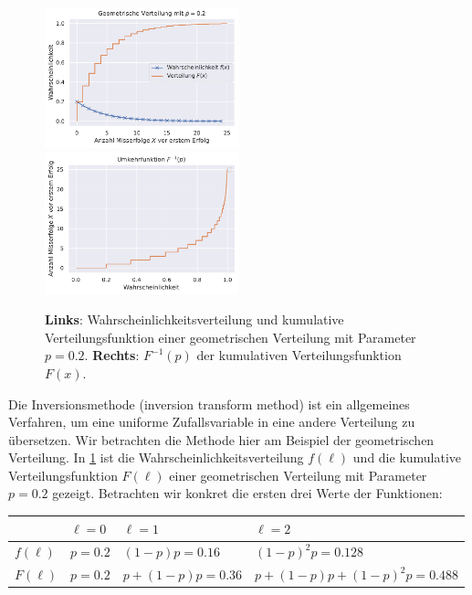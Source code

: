 \begin{figure}[t]
    \begin{center}
        \includegraphics[width=0.5\textwidth]{data/geometric-distr.pdf}%
        \includegraphics[width=0.5\textwidth]{data/geometric-distr-inv.pdf}
    \end{center}

    \caption{
        \textbf{Links}: Wahrscheinlichkeitsverteilung und kumulative Verteilungsfunktion einer geometrischen Verteilung mit Parameter $p = 0.2$.
        \textbf{Rechts}:  $F^{-1}(p)$ der kumulativen Verteilungsfunktion $F(x)$.
    }
    \label{fig:geometric-distr}
\end{figure}

Die  Inversionsmethode (inversion transform method) ist ein allgemeines Verfahren, um eine uniforme Zufallsvariable in eine andere Verteilung zu übersetzen.
Wir betrachten die Methode hier am Beispiel der geometrischen Verteilung.
In \cref{fig:geometric-distr} ist die Wahrscheinlichkeitsverteilung $f(\ell)$ und die kumulative Verteilungsfunktion $F(\ell)$ einer geometrischen Verteilung mit Parameter $p = 0.2$ gezeigt.
%
Betrachten wir konkret die ersten drei Werte der Funktionen:

\begin{center}
    \begin{tabular}{l|p{}p{}p{}}
                  & $\ell = 0$ & $\ell = 1$              & $\ell = 2$                              \\\hline\hline
        $f(\ell)$ & $p =0.2$   & $(1 {-} p)p = 0.16$     & $(1 {-} p)^2p = 0.128$                  \\
        $F(\ell)$ & $p =0.2$   & $p{+}(1 {-} p)p = 0.36$ & $p{+}(1 {-} p)p{+}(1 {-} p)^2p = 0.488$
    \end{tabular}
\end{center}
\vspace{1em}


